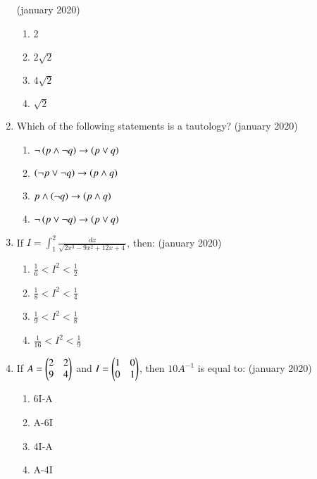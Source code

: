 \documentclass[journal,12pt,onecolumn]{IEEEtran}
\theoremstyle{remark}
\begin{document}
\begin{enumerate}
\hfill{(january 2020)}
    \begin{enumerate}
        \item 2
        \item $2\sqrt{2}$
        \item $4\sqrt{2}$
        \item $\sqrt{2}$
    \end{enumerate}
    \item Which of the following statements is a tautology?
\hfill{(january 2020)}
    \begin{enumerate}
        \item $\neg\left(p \land \neg q\right) \rightarrow \left(p \lor q\right)$
        \item $\left(\neg p \lor \neg q\right) \rightarrow \left(p \land q\right)$
        \item $ p \land \left(\neg q\right) \rightarrow \left(p \land q\right)$
        \item $\neg\left(p \lor \neg q\right) \rightarrow \left(p \lor q\right)$
    \end{enumerate}
    \item If $I=\int_{1}^{2} \frac{dx}{\sqrt{2x^3-9x^2+12x+4}}$, then:
\hfill{(january 2020)}
    \begin{enumerate}
        \item $\frac{1}{6}<I^2<\frac{1}{2}$
        \item $\frac{1}{8}<I^2<\frac{1}{4}$
        \item $\frac{1}{9}<I^2<\frac{1}{8}$
        \item $\frac{1}{16}<I^2<\frac{1}{9}$
    \end{enumerate}
    \item If $A = \begin{pmatrix}2 & 2 \\ 9 & 4\end{pmatrix} $ and $I=\begin{pmatrix}1 & 0 \\ 0 & 1\end{pmatrix}$, then $10 A^{-1}$ is equal to:
\hfill{(january 2020)}
    \begin{enumerate}
        \item 6I-A
        \item A-6I
        \item 4I-A
         \item A-4I
    \end{enumerate}
    \end{enumerate}
\end{document}
